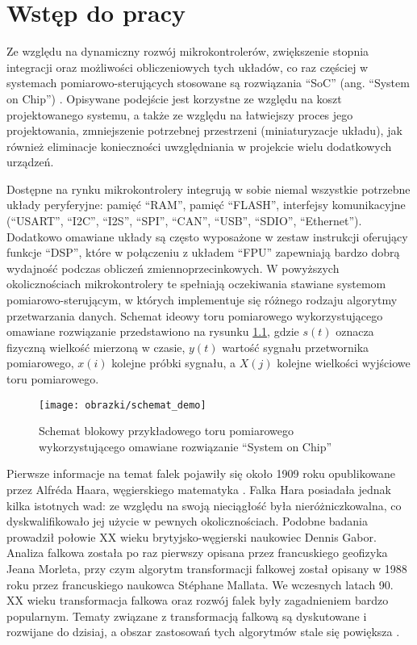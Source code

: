 \chapter{Wstęp do pracy}

Ze względu na dynamiczny rozwój mikrokontrolerów, zwiększenie stopnia integracji oraz możliwości obliczeniowych tych układów, co raz częściej w systemach pomiarowo-sterujących stosowane są rozwiązania \enquote{SoC} (ang. \enquote{System on Chip}) \cite{saleh_systemonchip}. Opisywane podejście jest korzystne ze względu na koszt projektowanego systemu, a także ze względu na łatwiejszy proces jego projektowania, zmniejszenie potrzebnej przestrzeni (miniaturyzacje układu), jak również eliminacje konieczności uwzględniania w projekcie wielu dodatkowych urządzeń.

Dostępne na rynku mikrokontrolery integrują w sobie niemal wszystkie potrzebne układy peryferyjne: pamięć \enquote{RAM}, pamięć \enquote{FLASH}, interfejsy komunikacyjne (\enquote{USART}, \enquote{I2C}, \enquote{I2S}, \enquote{SPI}, \enquote{CAN}, \enquote{USB}, \enquote{SDIO}, \enquote{Ethernet}). Dodatkowo omawiane układy są często wyposażone w zestaw instrukcji oferujący funkcje \enquote{DSP}, które w połączeniu z układem \enquote{FPU} zapewniają bardzo dobrą wydajność podczas obliczeń zmiennoprzecinkowych. W powyższych okolicznościach mikrokontrolery te spełniają oczekiwania stawiane systemom pomiarowo-sterującym, w których implementuje się różnego rodzaju algorytmy przetwarzania danych. Schemat ideowy toru pomiarowego wykorzystującego omawiane rozwiązanie przedstawiono na rysunku \ref{fig_chain_demo}, gdzie $s(t)$ oznacza fizyczną wielkość mierzoną w czasie, $y(t)$ wartość sygnału przetwornika pomiarowego, $x(i)$ kolejne próbki sygnału, a $X(j)$ kolejne wielkości wyjściowe toru pomiarowego.

\begin{figure}[htb!]
\begin{center}
\texttt{[image: obrazki/schemat\_demo]}
\caption{Schemat blokowy przykładowego toru pomiarowego wykorzystującego omawiane rozwiązanie \enquote{System on Chip} \label{fig_chain_demo}}
\end{center}
\end{figure}

Pierwsze informacje na temat falek pojawiły się około 1909 roku opublikowane przez Alfréda Haara, węgierskiego matematyka \cite{haar_basics}. Falka Hara posiadała jednak kilka istotnych wad: ze względu na swoją nieciągłość była nieróżniczkowalna, co dyskwalifikowało jej użycie w pewnych okolicznościach. Podobne badania prowadził połowie XX wieku brytyjsko-węgierski naukowiec Dennis Gabor. Analiza falkowa została po raz pierwszy opisana przez francuskiego geofizyka Jeana Morleta, przy czym algorytm transformacji falkowej został opisany w 1988 roku przez francuskiego naukowca Stéphane Mallata. We wczesnych latach 90. XX wieku transformacja falkowa oraz rozwój falek były zagadnieniem bardzo popularnym. Tematy związane z transformacją falkową są dyskutowane i rozwijane do dzisiaj, a obszar zastosowań tych algorytmów stale się powiększa \cite{akujuobi_applications}.

